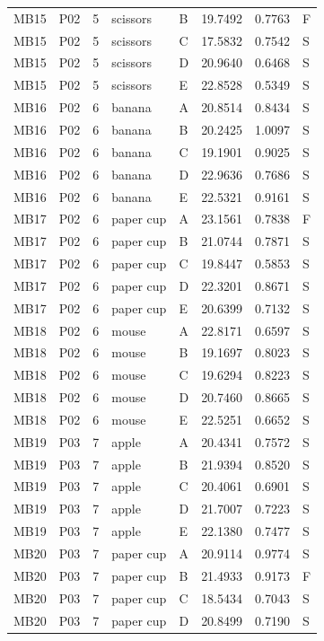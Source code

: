 \documentclass[11pt]{article}
\begin{document}
\begin{longtable}{lll llrrl}
MB15 & P02 & 5 & scissors & B & 19.7492 & 0.7763 & F \\
MB15 & P02 & 5 & scissors & C & 17.5832 & 0.7542 & S \\
MB15 & P02 & 5 & scissors & D & 20.9640 & 0.6468 & S \\
MB15 & P02 & 5 & scissors & E & 22.8528 & 0.5349 & S \\
MB16 & P02 & 6 & banana & A & 20.8514 & 0.8434 & S \\
MB16 & P02 & 6 & banana & B & 20.2425 & 1.0097 & S \\
MB16 & P02 & 6 & banana & C & 19.1901 & 0.9025 & S \\
MB16 & P02 & 6 & banana & D & 22.9636 & 0.7686 & S \\
MB16 & P02 & 6 & banana & E & 22.5321 & 0.9161 & S \\
MB17 & P02 & 6 & paper cup & A & 23.1561 & 0.7838 & F \\
MB17 & P02 & 6 & paper cup & B & 21.0744 & 0.7871 & S \\
MB17 & P02 & 6 & paper cup & C & 19.8447 & 0.5853 & S \\
MB17 & P02 & 6 & paper cup & D & 22.3201 & 0.8671 & S \\
MB17 & P02 & 6 & paper cup & E & 20.6399 & 0.7132 & S \\
MB18 & P02 & 6 & mouse & A & 22.8171 & 0.6597 & S \\
MB18 & P02 & 6 & mouse & B & 19.1697 & 0.8023 & S \\
MB18 & P02 & 6 & mouse & C & 19.6294 & 0.8223 & S \\
MB18 & P02 & 6 & mouse & D & 20.7460 & 0.8665 & S \\
MB18 & P02 & 6 & mouse & E & 22.5251 & 0.6652 & S \\
MB19 & P03 & 7 & apple & A & 20.4341 & 0.7572 & S \\
MB19 & P03 & 7 & apple & B & 21.9394 & 0.8520 & S \\
MB19 & P03 & 7 & apple & C & 20.4061 & 0.6901 & S \\
MB19 & P03 & 7 & apple & D & 21.7007 & 0.7223 & S \\
MB19 & P03 & 7 & apple & E & 22.1380 & 0.7477 & S \\
MB20 & P03 & 7 & paper cup & A & 20.9114 & 0.9774 & S \\
MB20 & P03 & 7 & paper cup & B & 21.4933 & 0.9173 & F \\
MB20 & P03 & 7 & paper cup & C & 18.5434 & 0.7043 & S \\
MB20 & P03 & 7 & paper cup & D & 20.8499 & 0.7190 & S \\

\end{longtable}
\end{document}

